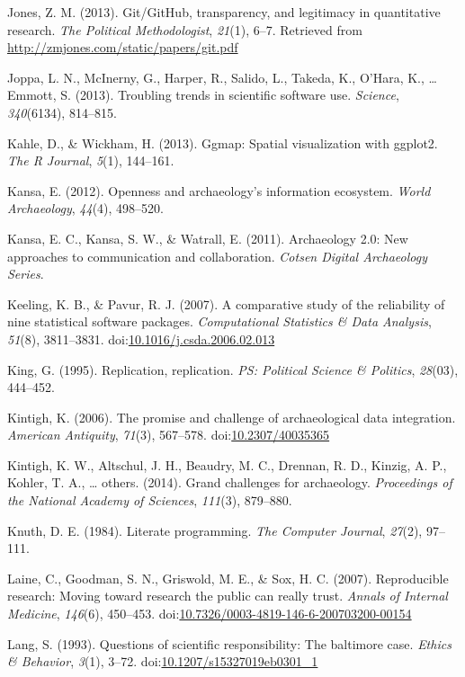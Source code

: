 \documentclass[american,man]{apa6}
\begin{document}
Jones, Z. M. (2013). Git/GitHub, transparency, and legitimacy in
quantitative research. \emph{The Political Methodologist}, \emph{21}(1),
6--7. Retrieved from \url{http://zmjones.com/static/papers/git.pdf}

Joppa, L. N., {McInerny}, G., Harper, R., Salido, L., Takeda, K.,
O'Hara, K., \ldots{} Emmott, S. (2013). Troubling trends in scientific
software use. \emph{Science}, \emph{340}(6134), 814--815.

Kahle, D., \& Wickham, H. (2013). Ggmap: Spatial visualization with
ggplot2. \emph{The R Journal}, \emph{5}(1), 144--161.

Kansa, E. (2012). Openness and archaeology's information ecosystem.
\emph{World Archaeology}, \emph{44}(4), 498--520.

Kansa, E. C., Kansa, S. W., \& Watrall, E. (2011). Archaeology 2.0: New
approaches to communication and collaboration. \emph{Cotsen Digital
Archaeology Series}.

Keeling, K. B., \& Pavur, R. J. (2007). A comparative study of the
reliability of nine statistical software packages. \emph{Computational
Statistics \& Data Analysis}, \emph{51}(8), 3811--3831.
doi:\href{http://dx.doi.org/10.1016/j.csda.2006.02.013}{10.1016/j.csda.2006.02.013}

King, G. (1995). Replication, replication. \emph{PS: Political Science
\& Politics}, \emph{28}(03), 444--452.

Kintigh, K. (2006). The promise and challenge of archaeological data
integration. \emph{American Antiquity}, \emph{71}(3), 567--578.
doi:\href{http://dx.doi.org/10.2307/40035365}{10.2307/40035365}

Kintigh, K. W., Altschul, J. H., Beaudry, M. C., Drennan, R. D., Kinzig,
A. P., Kohler, T. A., \ldots{} others. (2014). Grand challenges for
archaeology. \emph{Proceedings of the National Academy of Sciences},
\emph{111}(3), 879--880.

Knuth, D. E. (1984). Literate programming. \emph{The Computer Journal},
\emph{27}(2), 97--111.

Laine, C., Goodman, S. N., Griswold, M. E., \& Sox, H. C. (2007).
Reproducible research: Moving toward research the public can really
trust. \emph{Annals of Internal Medicine}, \emph{146}(6), 450--453.
doi:\href{http://dx.doi.org/10.7326/0003-4819-146-6-200703200-00154}{10.7326/0003-4819-146-6-200703200-00154}

Lang, S. (1993). Questions of scientific responsibility: The baltimore
case. \emph{Ethics \& Behavior}, \emph{3}(1), 3--72.
doi:\href{http://dx.doi.org/10.1207/s15327019eb0301_1}{10.1207/s15327019eb0301\_1}
\end{document}
